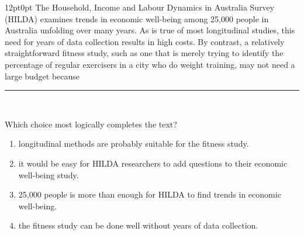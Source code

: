 \documentclass[11pt, twocolumn]{article}
\newcounter{questionnum}
\begin{document}
\vspace{6pt}\noindent
\begin{minipage}{\columnwidth}\raggedright
\noindent{}\par\vspace{8pt}
\begin{adjustwidth}{12pt}{0pt}
The Household, Income and Labour Dynamics in Australia Survey (HILDA) examines trends in economic well-being among 25,000 people in Australia unfolding over many years. As is true of most longitudinal studies, this need for years of data collection results in high costs. By contrast, a relatively straightforward fitness study, such as one that is merely trying to identify the percentage of regular exercisers in a city who do weight training, may not need a large budget because \,\rule{2cm}{0.4pt}\,
\vspace{6pt}

Which choice most logically completes the text?
\begin{enumerate}[label=\Alph*),leftmargin=18pt,topsep=3pt,itemsep=2pt]
  \item longitudinal methods are probably suitable for the fitness study.
  \item it would be easy for HILDA researchers to add questions to their economic well-being study.
  \item 25,000 people is more than enough for HILDA to find trends in economic well-being.
  \item the fitness study can be done well without years of data collection.
\end{enumerate}
\end{adjustwidth}
\end{minipage}\par
\end{document}
